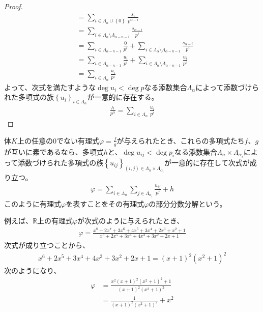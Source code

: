 \documentclass[dvipdfmx]{jsarticle}
\begin{document}
\begin{proof}
\begin{align*}
&= \sum_{i \in \varLambda_{n} \cup \left\{ 0 \right\}} \frac{s_{i}}{p^{\alpha - i}}\\
&= \sum_{i \in \varLambda_{\alpha} \setminus \varLambda_{\alpha - n - 1}} \frac{s_{\alpha - i}}{p^{i}}\\
&= \sum_{i \in \varLambda_{\alpha - n - 1}} \frac{0}{p^{i}} + \sum_{i \in \varLambda_{\alpha} \setminus \varLambda_{\alpha - n - 1}} \frac{s_{\alpha - i}}{p^{i}}\\
&= \sum_{i \in \varLambda_{\alpha - n - 1}} \frac{u_{i}}{p^{i}} + \sum_{i \in \varLambda_{\alpha} \setminus \varLambda_{\alpha - n - 1}} \frac{u_{i}}{p^{i}}\\
&= \sum_{i \in \varLambda_{\alpha}} \frac{u_{i}}{p^{i}}
\end{align*}
よって、次式を満たすような$\deg u_{i} < \deg p$なる添数集合$\varLambda_{\alpha}$によって添数づけられた多項式の族$\left\{ u_{i} \right\}_{i \in \varLambda_{\alpha}}$が一意的に存在する。
\begin{align*}
\frac{h}{p^{\alpha}} = \sum_{i \in \varLambda_{\alpha}} \frac{u_{i}}{p^{i}}
\end{align*}
\end{proof}
\begin{thm}[部分分数分解]\label{3.3.4.26}
体$K$上の任意の$0$でない有理式$\varphi = \frac{f}{g}$が与えられたとき、これらの多項式たち$f$、$g$が互いに素であるなら、多項式$h$と、$\deg u_{ij} < \deg p_{i}$なる添数集合$\varLambda_{n} \times \varLambda_{\alpha_{i}}$によって添数づけられた多項式の族$\left\{ u_{ij} \right\}_{(i,j) \in \varLambda_{n} \times \varLambda_{\alpha_{i}}}$が一意的に存在して次式が成り立つ。
\begin{align*}
\varphi = \sum_{i \in \varLambda_{n}} {\sum_{j \in \varLambda_{\alpha_{i}}} \frac{u_{ij}}{p^{j}}} + h
\end{align*}
このように有理式$\varphi$を表すことをその有理式$\varphi$の部分分数分解という。
\end{thm}\par
例えば、$\mathbb{R}$上の有理式$\varphi$が次式のように与えられたとき、
\begin{align*}
\varphi = \frac{x^{8} + 2x^{7} + 3x^{6} + 4x^{5} + 3x^{4} + 2x^{3} + x^{2} + 1}{x^{6} + 2x^{5} + 3x^{4} + 4x^{3} + 3x^{2} + 2x + 1}
\end{align*}
次式が成り立つことから、
\begin{align*}
x^{6} + 2x^{5} + 3x^{4} + 4x^{3} + 3x^{2} + 2x + 1 = (x + 1)^{2}\left( x^{2} + 1 \right)^{2}
\end{align*}
次のようになり、
\begin{align*}
\varphi &= \frac{x^{2}(x + 1)^{2}\left( x^{2} + 1 \right)^{2} + 1}{(x + 1)^{2}\left( x^{2} + 1 \right)^{2}}\\
&= \frac{1}{(x + 1)^{2}\left( x^{2} + 1 \right)^{2}} + x^{2} 
\end{align*}
\end{document}

